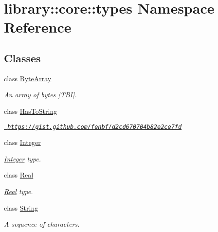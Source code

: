 \hypertarget{namespacelibrary_1_1core_1_1types}{}\section{library\+::core\+::types Namespace Reference}
\label{namespacelibrary_1_1core_1_1types}
\subsection*{Classes}
\begin{DoxyCompactItemize}
\item 
class \mbox{\hyperlink{classlibrary_1_1core_1_1types_1_1_byte_array}{Byte\+Array}}
\begin{DoxyCompactList}\small\item\em An array of bytes \mbox{[}T\+BI\mbox{]}. \end{DoxyCompactList}\item 
class \mbox{\hyperlink{classlibrary_1_1core_1_1types_1_1_has_to_string}{Has\+To\+String}}
\begin{DoxyCompactList}\small\item\em \href{https://gist.github.com/fenbf/d2cd670704b82e2ce7fd}{\texttt{ https\+://gist.\+github.\+com/fenbf/d2cd670704b82e2ce7fd}} \end{DoxyCompactList}\item 
class \mbox{\hyperlink{classlibrary_1_1core_1_1types_1_1_integer}{Integer}}
\begin{DoxyCompactList}\small\item\em \mbox{\hyperlink{classlibrary_1_1core_1_1types_1_1_integer}{Integer}} type. \end{DoxyCompactList}\item 
class \mbox{\hyperlink{classlibrary_1_1core_1_1types_1_1_real}{Real}}
\begin{DoxyCompactList}\small\item\em \mbox{\hyperlink{classlibrary_1_1core_1_1types_1_1_real}{Real}} type. \end{DoxyCompactList}\item 
class \mbox{\hyperlink{classlibrary_1_1core_1_1types_1_1_string}{String}}
\begin{DoxyCompactList}\small\item\em A sequence of characters. \end{DoxyCompactList}\end{DoxyCompactItemize}

